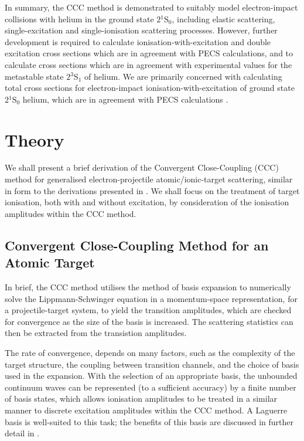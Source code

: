 \documentclass[]{article}
\begin{document}
In summary, the CCC method is demonstrated to suitably model electron-impact
collisions with helium in the ground state $2{}^{1}\mathrm{S}_{0}$, including
elastic scattering, single-excitation and single-ionisation scattering
processes.
However, further development is required to calculate ionisation-with-excitation
and double excitation cross sections which are in agreement with PECS
calculations, and to calculate cross sections which are in agreement with
experimental values for the metastable state $2{}^{3}\mathrm{S}_{1}$ of helium.
We are primarily concerned with calculating total cross sections for
electron-impact ionisation-with-excitation of ground state
$2{}^{1}\mathrm{S}_{0}$ helium, which are in agreement with PECS calculations
\cite{PhysRevA.81.022716}.

\clearpage

\section{Theory}
\label{sec:th}

We shall present a brief derivation of the Convergent Close-Coupling (CCC)
method for generalised electron-projectile atomic/ionic-target scattering,
similar in form to the derivations presented in \cite{BRAY19951, AJP_BRAY1996}.
We shall focus on the treatment of target ionisation, both with and without
excitation, by consideration of the ionisation amplitudes within the CCC method.

\subsection{Convergent Close-Coupling Method for an Atomic Target}
\label{sec:th-ccc}

In brief, the CCC method utilises the method of basis expansion to numerically
solve the Lippmann-Schwinger equation in a momentum-space representation, for a
projectile-target system, to yield the transition amplitudes, which are checked
for convergence as the size of the basis is increased.
The scattering statistics can then be extracted from the transistion amplitudes.

The rate of convergence, depends on many factors, such as the complexity of the
target structure, the coupling between transition channels, and the choice of
basis used in the expansion.
With the selection of an appropriate basis, the unbounded continuum waves can be
represented (to a sufficient accuracy) by a finite number of basis states, which
allows ionisation amplitudes to be treated in a similar manner to discrete
excitation amplitudes within the CCC method.
A Laguerre basis is well-suited to this task; the benefits of this basis are
discussed in further detail in \cite[5-9]{BRAY19951}.
\end{document}
